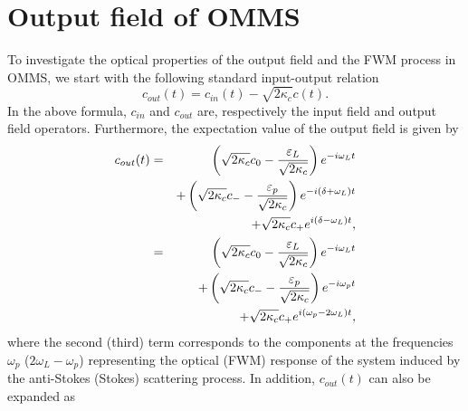 \documentclass[aps,pra,superscriptaddress,balancelastpage,twocolumn]{revtex4}
\begin{document}
\section{Output field of OMMS}
To investigate the optical properties of the output field and the FWM
process in OMMS, we start with the following standard input-output relation
\cite{DFW}
\begin{equation}
c_{out}(t)={c}_{in}(t)-\sqrt{2\kappa _{c}}c(t).
\end{equation}%
In the above formula, ${c}_{in}$ and $c_{out}$ are, respectively the input
field and output field operators. Furthermore, the expectation value of the
output field is given by%
\begin{eqnarray}
c_{out}(t) &=&\left( \sqrt{2\kappa _{c}}c_{0}-\frac{\varepsilon _{L}}{\sqrt{%
2\kappa _{c}}}\right) e^{-i\omega _{L}t}  \notag \\
&&+ \left( \sqrt{2\kappa _{c}}c_{-}-\frac{\varepsilon _{p}}{\sqrt{2\kappa
_{c}}}\right) e^{-i(\delta+\omega _{L} )t}  \notag \\
&&+\sqrt{2\kappa _{c}}c_{+}e^{i(\delta-\omega _{L} )t},  \notag \\
&=&\left( \sqrt{2\kappa _{c}}c_{0}-\frac{\varepsilon _{L}}{\sqrt{2\kappa _{c}%
}}\right) e^{-i\omega _{L}t}  \notag \\
&&+\left( \sqrt{2\kappa _{c}}c_{-}-\frac{\varepsilon _{p}}{\sqrt{2\kappa _{c}%
}}\right) e^{-i\omega _{p}t}  \notag \\
&&+\sqrt{2\kappa _{c}}c_{+}e^{i(\omega _{p}-2\omega _{L})t} ,  \label{c1}
\end{eqnarray}%
where the second (third) term corresponds to the components at the
frequencies $\omega _{p}$ ($2\omega _{L}-\omega _{p}$) representing the
optical (FWM) response of the system induced by the anti-Stokes (Stokes)
scattering process. In addition, $c_{out}(t)$ can also be expanded as
\end{document}

